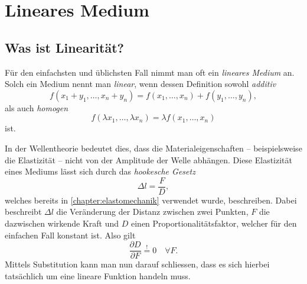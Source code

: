 %
%
%
%
\section{Lineares Medium\label{particles:section:linear}}

\subsection{Was ist Linearität?}
Für den einfachsten und üblichsten Fall nimmt man oft ein \emph{lineares Medium} an.
Solch ein Medium nennt man \emph{linear}, wenn dessen Definition sowohl \emph{additiv}
\[
    f(x_{1} + y_{1}, \ldots, x_{n} + y_{n}) 
    = 
    f(x_{1}, \ldots, x_{n}) 
    + 
    f(y_{1}, \ldots, y_{n}),
\]
als auch \emph{homogen}
\[
    f(\lambda x_{1}, \ldots, \lambda x_{n}) 
    = 
    \lambda f(x_{1}, \ldots, x_{n})
\]
ist.

In der Wellentheorie bedeutet dies, 
dass die Materialeigenschaften -- beispielsweise die Elastizität -- nicht von der Amplitude der Welle abhängen.
Diese Elastizität eines Mediums lässt sich durch das \emph{hookesche Gesetz}
\[
    \Delta l
    = 
    \frac{F}{D}
    \label{particles:eq:hookesches-gesetz},
\]
welches bereits in \autoref{chapter:elastomechanik} verwendet wurde, beschreiben.
Dabei beschreibt $\Delta l$ die Veränderung der Distanz zwischen zwei Punkten,
$F$ die dazwischen wirkende Kraft und $D$ einen Proportionalitätsfaktor, 
welcher für den einfachen Fall konstant ist. Also gilt 
\[
    \frac{\partial D}{\partial F} 
    \overset{!}{=} 
    0 
    \quad 
    \forall F.
\]
Mittels Substitution kann man nun darauf schliessen, 
dass es sich hierbei tatsächlich um eine lineare Funktion handeln muss.

